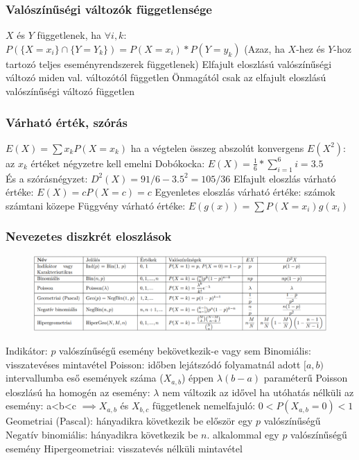 \documentclass[12pt,a4paper]{article}
\begin{document}
\subsubsection{Valószínűségi változók függetlensége}

\begin{outline}
	\1 $X$ és $Y$ függetlenek, ha $\forall i,k:$\\
	$P(\{X=x_i\} \cap \{Y = Y_k\}) = P(X=x_i)*P(Y=y_k)$
		\2 (Azaz, ha $X$-hez és $Y$-hoz tartozó teljes eseményrendszerek függetlenek)
	\1 Elfajult eloszlású valószínűségi változó miden val. változótól független
	\1 Önmagától csak az elfajult eloszlású valószínűségi változó független
\end{outline}

\subsubsection{Várható érték, szórás}

\begin{outline}
	\1 $E(X)=\sum x_k P(X=x_k)$ ha a végtelen összeg abszolút konvergens
		\2 $E(X^2)$: az $x_k$ értéket négyzetre kell emelni
		\2 Dobókocka: $E(X)= \frac{1}{6}*\sum_{i=1}^{6} i = 3.5$\\
		És a szórásnégyzet: $D^2(X)=91/6 - 3.5^2 = 105/36$
	\1 Elfajult eloszlás várható értéke: $E(X)=cP(X=c)=c$
	\1 Egyenletes eloszlás várható értéke: számok számtani közepe
	\1 Függvény várható értéke: $E(g(x)) = \sum P(X=x_i) g(x_i)$
\end{outline}

\pagebreak

\subsubsection{Nevezetes diszkrét eloszlások}

\begin{figure}[h!]
	\centering
	\includegraphics[width=1\linewidth]{diszkrét-eloszlások}
\end{figure}

\begin{outline}
	\1 Indikátor: $p$ valószínűségű esemény bekövetkezik-e vagy sem
	\1 Binomiális: visszatevéses mintavétel
	\1 Poisson: időben lejátszódó folyamatnál adott $[a,b)$ intervallumba eső események száma ($X_{a,b}$) éppen $\lambda(b-a)$ paraméterű Poisson eloszlású
		\2 ha homogén az esemény: $\lambda$ nem változik az idővel
		\2 ha utóhatás nélküli az esemény: a<b<c $\implies X_{a,b}$ és $X_{b,c}$ függetlenek
		\2 nemelfajuló: $0 < P(X_{a,b}=0) < 1$
	\1 Geometriai (Pascal): hányadikra következik be először egy $p$ valószínűségű
	\1 Negatív binomiális: hányadikra következik be $n$. alkalommal egy $p$ valószínűségű esemény
	\1 Hipergeometriai: visszatevés nélküli mintavétel
\end{outline}
\end{document}

